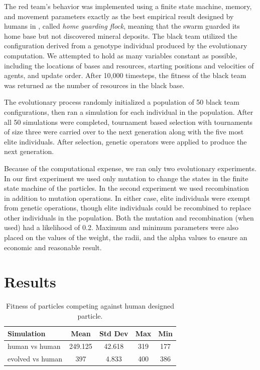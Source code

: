 \documentclass[conference,final]{IEEEtran}
\begin{document}
The red team's behavior was implemented using a finite state machine, memory, and movement parameters exactly as the best empirical result designed by humans in \cite{rodriguez2004extending}, called \textit{home guarding flock}, meaning that the swarm guarded its home base but not discovered mineral deposits. The black team utilized the configuration derived from a genotype individual produced by the evolutionary computation. We attempted to hold as many variables constant as possible, including the locations of bases and resources, starting positions and velocities of agents, and update order. After 10,000 timesteps, the fitness of the black team was returned as the number of resources in the black base.

The evolutionary process randomly initialized a population of 50 black team configurations, then ran a simulation for each individual in the population. After all 50 simulations were completed, tournament based selection with tournaments of size three were carried over to the next generation along with the five most elite individuals. After selection, genetic operators were applied to produce the next generation.

Because of the computational expense, we ran only two evolutionary experiments. In our first experiment we used only mutation to change the states in the finite state machine of the particles. In the second experiment we used recombination in addition to mutation operations. In either case, elite individuals were exempt from genetic operations, though elite individuals could be recombined to replace other individuals in the population. Both the mutation and recombination (when used) had a likelihood of 0.2. Maximum and minimum parameters were also placed on the values of the weight, the radii, and the alpha values to ensure an economic and reasonable result.

\section{Results}

\begin{table}[t!]
    \renewcommand{\arraystretch}{1.5}
    \centering
    \caption{Fitness of particles competing against human designed particle.}
    \label{table:meanfitness}
    \begin{tabular}{l | c c cc}
        \hline
        Simulation & Mean & Std Dev & Max & Min \\
        \hline
        human vs human & 249.125 & 42.618 & 319 & 177 \\
        evolved vs human & 397 & 4.833 & 400 & 386 \\
        \hline
    \end{tabular}
\end{table}
\end{document}
